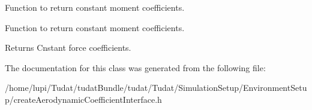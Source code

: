 Function to return constant moment coefficients. 

Function to return constant moment coefficients. \begin{DoxyReturn}{Returns}
Cnstant force coefficients. 
\end{DoxyReturn}


The documentation for this class was generated from the following file\+:\begin{DoxyCompactItemize}
\item 
/home/lupi/\+Tudat/tudat\+Bundle/tudat/\+Tudat/\+Simulation\+Setup/\+Environment\+Setup/create\+Aerodynamic\+Coefficient\+Interface.\+h\end{DoxyCompactItemize}
